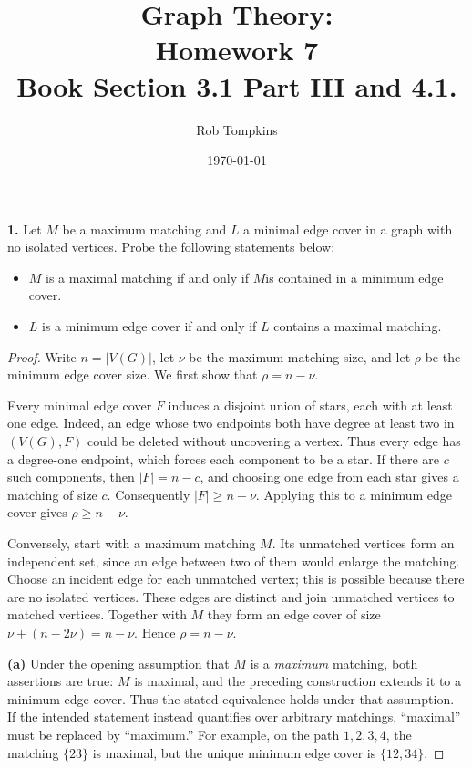 \documentclass[12pt]{amsart}
\title{Graph Theory:\\Homework 7\\ Book Section 3.1 Part III and 4.1.}
\author{Rob Tompkins}
\date{\today}
\theoremstyle{conjecture}
\theoremstyle{definition}
\theoremstyle{question}
\theoremstyle{theorem}
\begin{document}
    \maketitle
    \noindent\textbf{1.} Let $M$ be a maximum matching and $L$ a minimal edge cover in a graph with no
    isolated vertices.
    Probe the following statements below:
    \begin{itemize}
        \item[(a)] $M$ is a maximal matching if and only if $M$is contained in a minimum edge cover.
        \item[(b)] $L$ is a minimum edge cover if and only if $L$ contains a maximal matching.
    \end{itemize}

    \begin{proof}

    Write $n=|V(G)|$, let $\nu$ be the maximum matching size, and let
    $\rho$ be the minimum edge cover size. We first show that
    $\rho=n-\nu$.

    Every minimal edge cover $F$ induces a disjoint union of stars, each
    with at least one edge. Indeed, an edge whose two endpoints both have
    degree at least two in $(V(G),F)$ could be deleted without uncovering
    a vertex. Thus every edge has a degree-one endpoint, which forces
    each component to be a star. If there are $c$ such components, then
    $|F|=n-c$, and choosing one edge from each star gives a matching of
    size $c$. Consequently $|F|\ge n-\nu$. Applying this to a minimum
    edge cover gives $\rho\ge n-\nu$.

    Conversely, start with a maximum matching $M$. Its unmatched vertices
    form an independent set, since an edge between two of them would
    enlarge the matching. Choose an incident edge for each unmatched
    vertex; this is possible because there are no isolated vertices.
    These edges are distinct and join unmatched vertices to matched
    vertices. Together with $M$ they form an edge cover of size
    $\nu+(n-2\nu)=n-\nu$. Hence $\rho=n-\nu$.

    \smallskip
    \noindent\textbf{(a)} Under the opening assumption that $M$ is a
    \emph{maximum} matching, both assertions are true: $M$ is maximal,
    and the preceding construction extends it to a minimum edge cover.
    Thus the stated equivalence holds under that assumption.
    If the intended statement instead quantifies over arbitrary matchings,
    ``maximal'' must be replaced by ``maximum.'' For example, on the path
    $1,2,3,4$, the matching $\{23\}$ is maximal, but the unique minimum
    edge cover is $\{12,34\}$.


\end{proof}
\end{document}

